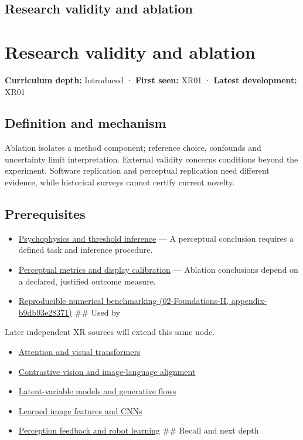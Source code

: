 \hypertarget{appendix-65788587ef78}{}
\section*{Research validity and ablation}
\chapter{Research validity and ablation}\label{appendix-65788587ef78-research-validity-and-ablation}

\textbf{Curriculum depth:} Introduced · \textbf{First seen:} XR01 · \textbf{Latest development:} XR01

\section{Definition and mechanism}\label{appendix-65788587ef78-definition-and-mechanism}

Ablation isolates a method component; reference choice, confounds and uncertainty limit interpretation. External validity concerns conditions beyond the experiment. Software replication and perceptual replication need different evidence, while historical surveys cannot certify current novelty.

\section{Prerequisites}\label{appendix-65788587ef78-prerequisites}

\begin{itemize}
\item
  \hyperref[appendix-1759f03e8ce7]{Psychophysics and threshold inference} --- A perceptual conclusion requires a defined task and inference procedure.
\item
  \hyperref[appendix-b2c1846508bf]{Perceptual metrics and display calibration} --- Ablation conclusions depend on a declared, justified outcome measure.
\item
  \href{../02-Foundations-II/main.pdf\#nameddest=appendix-b9db93e28371}{Reproducible numerical benchmarking (02-Foundations-II, appendix-b9db93e28371)} \#\# Used by
\end{itemize}

Later independent XR sources will extend this same node.

\begin{itemize}
\tightlist
\item
  \hyperref[appendix-a9d5dfdd164a]{Attention and visual transformers}
\item
  \hyperref[appendix-772f1fd96148]{Contrastive vision and image-language alignment}
\item
  \hyperref[appendix-2c568f05ee34]{Latent-variable models and generative flows}
\item
  \hyperref[appendix-47c51ea026fb]{Learned image features and CNNs}
\item
  \hyperref[appendix-b0c42da325f1]{Perception feedback and robot learning} \#\# Recall and next depth
\end{itemize}

